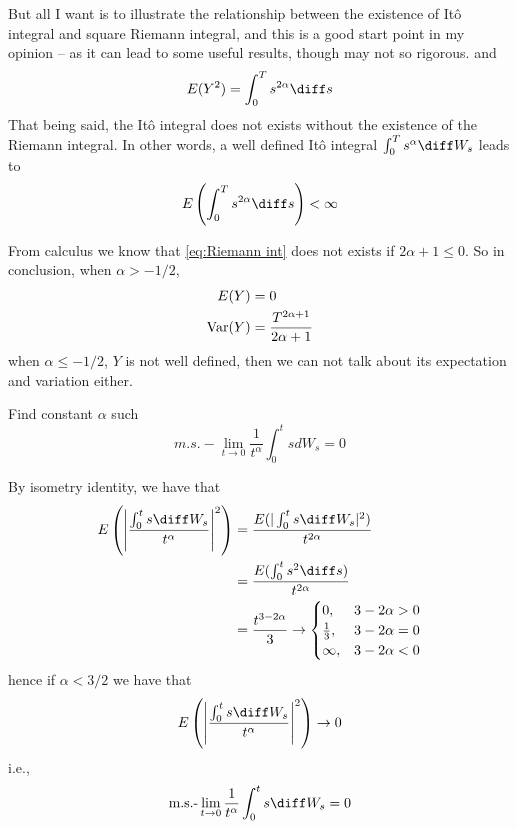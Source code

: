 \begin{subproblem}[(\arabic*).]
{            But all I want is to
            illustrate the relationship between the existence of It\^o integral
            and square Riemann integral, and this is a good start point
            in my opinion -- as it can lead to some useful results,
            though may not so rigorous.
        }
        and
        \[E(Y^2)=\int_0^Ts^{2\alpha}\diff s\]
        That being said, the It\^o integral does not exists
        without the existence of the Riemann integral.
        In other words, a well defined It\^o integral
        $\int_0^Ts^\alpha\diff W_s$
        leads to
        \[E\left(\int_0^Ts^{2\alpha}\diff s\right)<\infty\]

        From calculus we know that \cref{eq:Riemann int} does
        not exists if $2\alpha+1\leq 0$.
        So in conclusion,
        when $\alpha>-1/2$,
        \[\begin{aligned}
            E(Y)&=0\\
            \mathrm{Var}(Y)&=\frac{T^{2\alpha+1}}{2\alpha+1}
        \end{aligned}\]
        when $\alpha\leq -1/2$, $Y$ is not well defined, then
        we can not talk about its expectation and variation either.
    \end{subproblem}

    \problem
    \begin{question}
        Find constant $\alpha$ such
        \[m.s.-\lim_{t\rightarrow 0}\frac{1}{t^\alpha}\int_0^t sdW_s=0\]
    \end{question}
    By isometry identity, we have that
    \[\begin{aligned}
        E\left(
            \left|\frac{\int_0^ts\diff W_s}{t^\alpha}\right|^2
        \right)&=\frac{E(|\int_0^ts\diff W_s|^2)}{t^{2\alpha}}\\
        &=\frac{E(\int_0^ts^2\diff s)}{t^{2\alpha}}\\
        &=\frac{t^{3-2\alpha}}{3}\to
        \begin{cases}
            0,&3-2\alpha>0\\
            \frac{1}{3},&3-2\alpha=0\\
            \infty,&3-2\alpha<0
        \end{cases}
    \end{aligned}\]
    hence if $\alpha<3/2$ we have that
    \[E\left(
            \left|\frac{\int_0^ts\diff W_s}{t^\alpha}\right|^2
        \right)\to 0\]
    i.e.,
    \[\text{m.s.-}\lim_{t\to0}\frac{1}{t^\alpha}\int_0^ts\diff W_s=0\]

